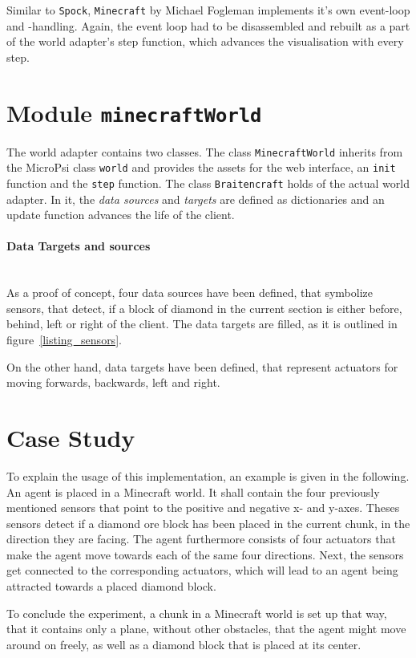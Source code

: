 Similar to \texttt{Spock}, \texttt{Minecraft} by Michael Fogleman implements it's own event-loop and -handling. Again, the event loop had to be disassembled and rebuilt as a part of the world adapter's step function, which advances the visualisation with every step.

    \section{Module \texttt{minecraftWorld}}
The world adapter contains two classes. The class \texttt{MinecraftWorld} inherits from the MicroPsi class \texttt{world} and provides the assets for the web interface, an \texttt{init} function and the \texttt{step} function. The class \texttt{Braitencraft} holds of the actual world adapter. In it, the \emph{data sources} and \emph{targets} are defined as dictionaries and an update function advances the life of the client.
    
\paragraph{Data Targets and sources}$\;$ \\

As a proof of concept, four data sources have been defined, that symbolize sensors, that detect, if a block of diamond in the current section is either before, behind, left or right of the client. The data targets are filled, as it is outlined in figure~\ref{listing_sensors}.

On the other hand, data targets have been defined, that represent actuators for moving forwards, backwards, left and right.

    \section{Case Study}
To explain the usage of this implementation, an example is given in the following. An agent is placed in a Minecraft world. It shall contain the four previously mentioned sensors that point to the positive and negative x- and y-axes. Theses sensors detect if a diamond ore block has been placed in the current chunk, in the direction they are facing. The agent furthermore consists of four actuators that make the agent move towards each of the same four directions. Next, the sensors get connected to the corresponding actuators, which will lead to an agent being attracted towards a placed diamond block.

To conclude the experiment, a chunk in a Minecraft world is set up that way, that it contains only a plane, without other obstacles, that the agent might move around on freely, as well as a diamond block that is placed at its center. 

